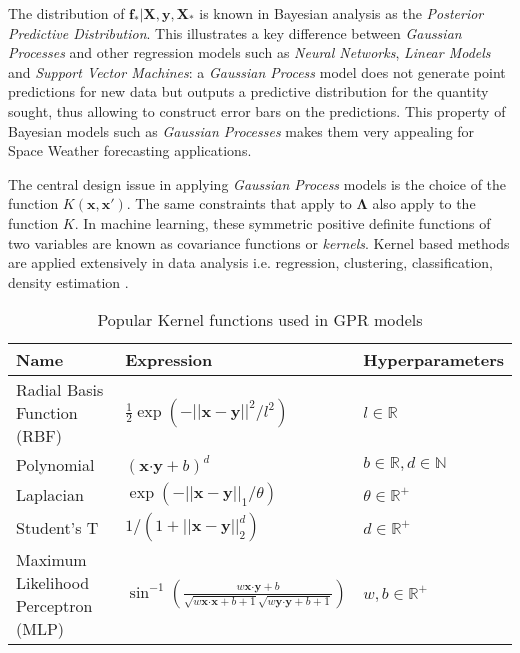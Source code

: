 The distribution of $\mathbf{f_*}| \mathbf{X},\mathbf{y},\mathbf{X_*}$ is known in Bayesian 
analysis as the \emph{Posterior Predictive Distribution}. This illustrates a key difference between 
\emph{Gaussian Processes} and other regression models such as \emph{Neural Networks}, 
\emph{Linear Models} and \emph{Support Vector Machines}: a \emph{Gaussian Process} model does not 
generate point predictions for new data but outputs a predictive distribution for the quantity 
sought, thus allowing to construct error bars on the predictions. This property of Bayesian models 
such as \emph{Gaussian Processes} makes them very appealing for Space Weather forecasting 
applications. 

The central design issue in applying \emph{Gaussian Process} models is the choice of the function 
$K(\mathbf{x}, \mathbf{x}')$. The same constraints that apply to $\mathbf{\Lambda}$ also apply to 
the function $K$. In machine learning, these symmetric positive definite functions of two variables 
are known as covariance functions or \emph{kernels}. Kernel based methods are applied extensively 
in data analysis \citep{Scholkopf:2001:LKS:559923,hofmann2008} i.e. regression, clustering, 
classification, density estimation \citep{Girolami:2002:OSD:638929.638938}.

\begin{table}[ht]
    \caption{Popular Kernel functions used in GPR models}
    \centering
    \begin{tabular}{l l l}
    \hline
     \textbf{Name}  & \textbf{Expression} & \textbf{Hyperparameters}  \\
    \hline
      {\small Radial Basis Function (RBF)}  & ${\scriptstyle \frac{1}{2} \exp(-||\mathbf{x} - \mathbf{y}||^2/l^2)}$  & ${\scriptstyle l \in \mathbb{R}}$   \\
      
      {\small Polynomial}  & ${\scriptstyle (\mathbf{x}\boldsymbol{\cdot} \mathbf{y} + b)^d}$ & ${\scriptstyle b \in \mathbb{R}, d \in \mathbb{N}}$   \\
      
      {\small Laplacian}  & ${\scriptstyle \exp(-||\mathbf{x} - \mathbf{y}||_{1}/\theta)}$  & ${\scriptstyle \theta \in \mathbb{R}^+}$  \\
      
      {\small Student's T}  & ${\scriptstyle 1/(1 + ||\mathbf{x} - \mathbf{y}||_{2}^d)}$ & ${\scriptstyle d \in \mathbb{R}^{+}}$\\
      
      {\small Maximum Likelihood Perceptron (MLP)}  & ${\scriptstyle \sin^{-1}\left(\frac{w\mathbf{x}\boldsymbol{\cdot} \mathbf{y} + b}{\sqrt{w\mathbf{x}\boldsymbol{\cdot} \mathbf{x} + b + 1} \sqrt{w\mathbf{y}\boldsymbol{\cdot} \mathbf{y} + b + 1}}\right)}$ & ${\scriptstyle w, b \in \mathbb{R}^{+}}$\\
    \hline
    \end{tabular}
    \label{table:kernel}
\end{table}
    
